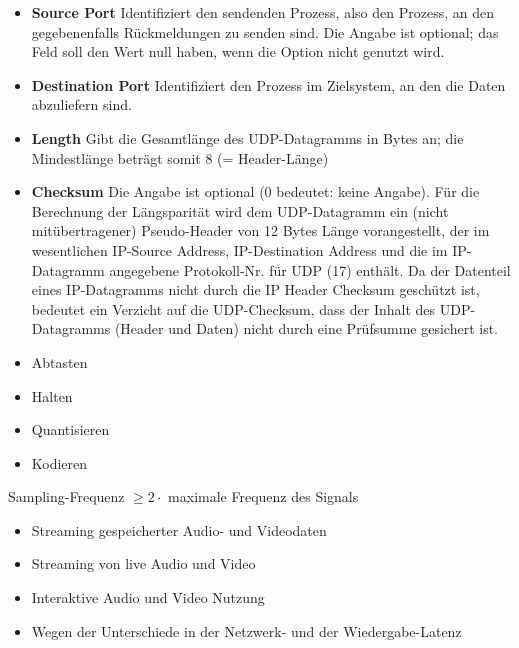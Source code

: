 \begin{itemize}
    \item \textbf{Source Port} Identifiziert den sendenden Prozess, also den Prozess, an den gegebenenfalls Rückmeldungen zu senden sind. Die Angabe ist optional; das Feld soll den Wert null haben, wenn die Option nicht genutzt wird.
    \item \textbf{Destination Port} Identifiziert den Prozess im Zielsystem, an den die Daten abzuliefern sind.
    \item \textbf{Length} Gibt die Gesamtlänge des UDP-Datagramms in Bytes an;
    die Mindestlänge beträgt somit 8 (= Header-Länge)
    \item \textbf{Checksum} Die Angabe ist optional (0 bedeutet: keine Angabe).
    Für die Berechnung der Längsparität wird dem UDP-Datagramm ein (nicht mitübertragener) Pseudo-Header von 12 Bytes Länge vorangestellt, der im wesentlichen IP-Source Address, IP-Destination Address und die im IP-Datagramm angegebene Protokoll-Nr. für UDP (17) enthält. Da der Datenteil eines IP-Datagramms nicht durch die IP Header Checksum geschützt ist, bedeutet ein Verzicht auf die UDP-Checksum, dass der Inhalt des UDP-Datagramms (Header und Daten) nicht durch eine Prüfsumme gesichert ist.
\end{itemize}

\begin{itemize}
    \item Abtasten
    \item Halten
    \item Quantisieren
    \item Kodieren
\end{itemize}

Sampling-Frequenz $\ge 2 \cdot$ maximale Frequenz des Signals

\begin{itemize}
    \item Streaming gespeicherter Audio- und Videodaten
    \item Streaming von live Audio und Video
    \item Interaktive Audio und Video Nutzung
\end{itemize}

\begin{itemize}
    \item Wegen der Unterschiede in der Netzwerk- und der Wiedergabe-Latenz
\end{itemize}

